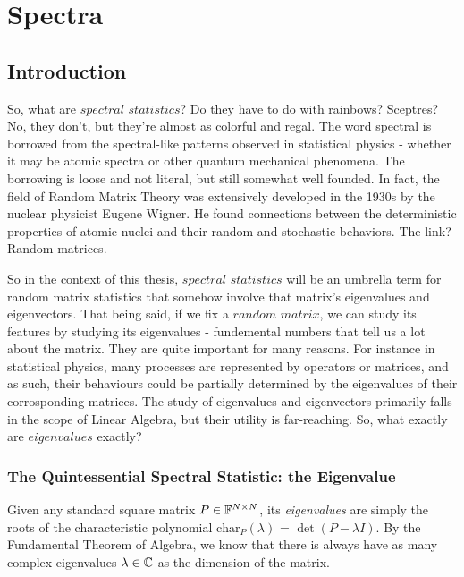 
\chapter{Spectra}

\section{Introduction}
So, what are $\textit{spectral statistics}$? Do they have to do with rainbows? Sceptres? No, they don’t, but they’re almost as colorful and regal. The word spectral is borrowed from the spectral-like patterns observed in statistical physics - whether it may be atomic spectra or other quantum mechanical phenomena. The borrowing is loose and not literal, but still somewhat well founded. In fact, the field of Random Matrix Theory was extensively developed in the 1930s by the nuclear physicist Eugene Wigner. He found connections between the deterministic properties of atomic nuclei and their random and stochastic behaviors. The link? Random matrices.

So in the context of this thesis, $\textit{spectral statistics}$ will be an umbrella term for random matrix statistics that somehow involve that matrix's eigenvalues and eigenvectors. That being said, if we fix a $\textit{random matrix}$, we can study its features by studying its eigenvalues - fundemental numbers that tell us a lot about the matrix. They are quite important for many reasons. For instance in statistical physics, many processes are represented by operators or matrices, and as such, their behaviours could be partially determined by the eigenvalues of their corrosponding matrices. The study of eigenvalues and eigenvectors primarily falls in the scope of Linear Algebra, but their utility is far-reaching. So, what exactly are $\textit{eigenvalues}$ exactly?


\subsection{The Quintessential Spectral Statistic: the Eigenvalue}
Given any standard square matrix $P \in \mathbb{F}^{N \times N}$, its \textit{eigenvalues} are simply the roots of the characteristic polynomial $\text{char}_P{(\lambda)}$ = $\det(P - \lambda I)$. By the Fundamental Theorem of Algebra, we know that there is always have as many complex eigenvalues $\lambda \in \mathbb{C}$ as the dimension of the matrix. 


